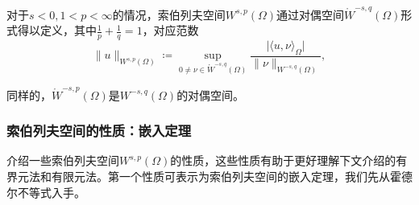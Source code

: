 对于$s < 0, 1<p<\infty$的情况，索伯列夫空间$W^{s,p}(\Omega)$通过对偶空间$\mathring{W}^{-s,q}(\Omega)$形式得以定义，其中$\frac{1}{p} + \frac{1}{q} = 1$，对应范数
\begin{equation*}
  \| u \| _{W^{s,p}(\Omega)} \coloneqq \sup_{0 \neq \nu \in \mathring{W}^{-s,q}(\Omega)} \frac{
  \big| \langle u,\nu \rangle_{\Omega} \big|
  }{
  \| \nu \|_{W^{-s,q}(\Omega)}
  },
\end{equation*}

同样的，$\mathring{W}^{-s,p}(\Omega)$是$W^{-s,q}(\Omega)$的对偶空间。

\subsubsection{索伯列夫空间的性质：嵌入定理}
介绍一些索伯列夫空间$W^{s,p}(\Omega)$的性质，这些性质有助于更好理解下文介绍的有界元法和有限元法。第一个性质可表示为索伯列夫空间的嵌入定理，我们先从霍德尔不等式入手。

